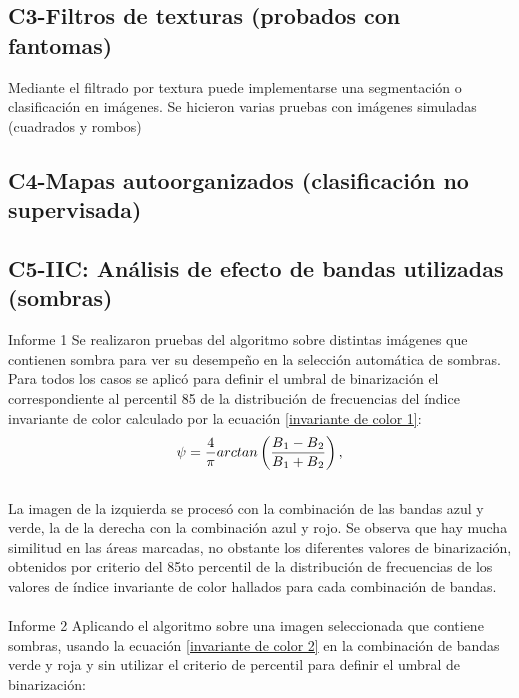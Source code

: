 \subsection{C3-Filtros de texturas (probados con fantomas)}
Mediante el filtrado por textura puede implementarse una segmentación o clasificación en imágenes. Se hicieron varias pruebas con imágenes simuladas (cuadrados y rombos)
\subsection{C4-Mapas autoorganizados (clasificación no supervisada)}
\subsection{C5-IIC: Análisis de efecto de bandas utilizadas (sombras)}
Informe 1
Se realizaron pruebas del algoritmo sobre distintas imágenes que contienen sombra para ver su desempeño en la selección automática de sombras. Para todos los casos se aplicó para definir el umbral de binarización el correspondiente al percentil 85 de la distribución de frecuencias del índice invariante de color calculado por la ecuación \ref{invariante de color 1}:
\\
\begin{equation}
	\psi=\frac{4}{\pi} arctan\left(\frac{B\textsubscript{1}-B\textsubscript{2}}{B\textsubscript{1}+B\textsubscript{2}}\right),\label{invariante de color 1}
\end{equation}
\\
La imagen de la izquierda se procesó con la combinación de las bandas azul y verde, la de la derecha con la combinación azul y rojo.
Se observa que hay mucha similitud en las áreas marcadas, no obstante los diferentes valores de binarización, obtenidos por criterio del 85to percentil de la distribución de frecuencias de los valores de índice invariante de color hallados para cada combinación de bandas.
\\
\\
Informe 2
Aplicando el algoritmo sobre una imagen seleccionada que contiene sombras, usando la ecuación \ref{invariante de color 2} en la combinación de bandas verde y roja y sin utilizar el criterio de percentil para definir el umbral de binarización:

